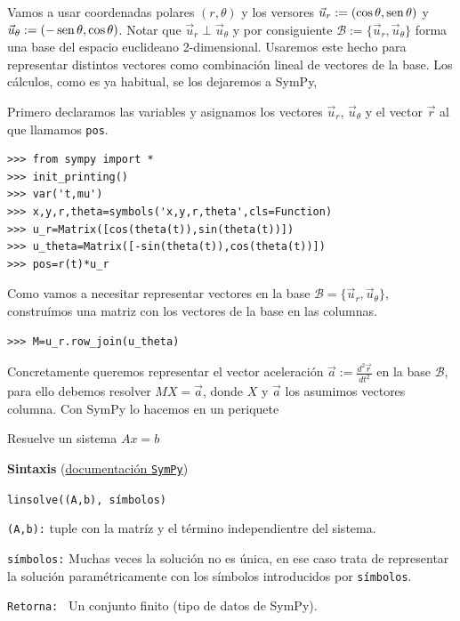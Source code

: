 Vamos a usar coordenadas polares $(r,\theta)$ y los versores $\vec{u}_r:=(\cos\theta,\sen\theta)$ y $\vec{u}_{\theta}:=(-\sen\theta, \cos\theta)$. Notar que
$\vec{u}_r \perp \vec{u}_{\theta}$ y por consiguiente $\mathcal{B}:=\{\vec{u}_r , \vec{u}_{\theta}\}$ forma una base del espacio euclideano 2-dimensional. Usaremos este hecho
para representar distintos vectores como combinación lineal de vectores de la base. Los cálculos, como es ya habitual, se los dejaremos a SymPy,


Primero declaramos las variables y asignamos los vectores $\vec{u}_r$, $\vec{u}_{\theta}$ y el vector
$\vec{r}$ al que llamamos \texttt{pos}.

\begin{lstlisting}
>>> from sympy import *
>>> init_printing()
>>> var('t,mu')
>>> x,y,r,theta=symbols('x,y,r,theta',cls=Function)
>>> u_r=Matrix([cos(theta(t)),sin(theta(t))])
>>> u_theta=Matrix([-sin(theta(t)),cos(theta(t))])
>>> pos=r(t)*u_r
\end{lstlisting}



Como vamos a necesitar representar vectores en la base $\mathcal{B}=\{\vec{u}_r , \vec{u}_{\theta}\}$, construímos una matriz
con los vectores de la base en las columnas.
\begin{lstlisting}
>>> M=u_r.row_join(u_theta)
\end{lstlisting}
Concretamente queremos representar el vector aceleración $\vec{a}:=\tfrac{d^2\vec{r}}{dt^2}$ en la base $\mathcal{B}$, para ello debemos resolver $MX=\vec{a}$, donde $X$ y
$\vec{a}$ los asumimos vectores columna. Con SymPy lo hacemos en un periquete

\begin{codigo}
Resuelve un sistema $Ax=b$

\textbf{Sintaxis} (\href{http://docs.sympy.org/dev/modules/solvers/solveset.html#sympy.solvers.solveset.linsolve}{documentación \texttt{SymPy}})

\texttt{linsolve((A,b), símbolos)}

\texttt{(A,b):} tuple con la matríz y el término independientre del sistema.

\texttt{símbolos:} Muchas veces la solución no es única, en ese caso trata de representar la solución paramétricamente con los símbolos introducidos por \texttt{símbolos}.

\texttt{Retorna: } Un conjunto finito (tipo de datos de SymPy).

\end{codigo}



